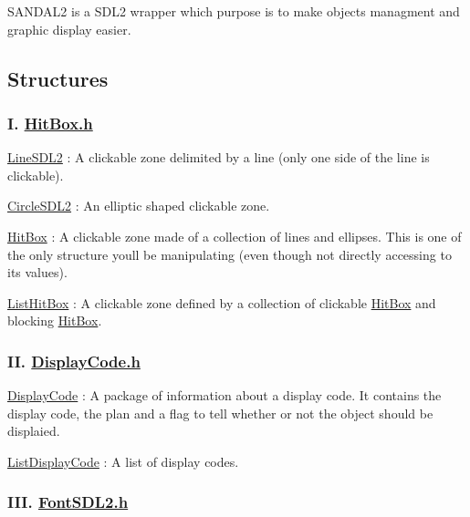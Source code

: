 S\+A\+N\+D\+A\+L2 is a S\+D\+L2 wrapper which purpose is to make objects managment and graphic display easier.

\subsection*{Structures}

\subsubsection*{I. \hyperlink{HitBox_8h}{Hit\+Box.\+h}}


\begin{DoxyEnumerate}
\item \hyperlink{structLineSDL2}{Line\+S\+D\+L2} \+: A clickable zone delimited by a line (only one side of the line is clickable).
\item \hyperlink{structCircleSDL2}{Circle\+S\+D\+L2} \+: An elliptic shaped clickable zone.
\item \hyperlink{structHitBox}{Hit\+Box} \+: A clickable zone made of a collection of lines and ellipses. This is one of the only structure you\textquotesingle{}ll be manipulating (even though not directly accessing to its values).
\item \hyperlink{structListHitBox}{List\+Hit\+Box} \+: A clickable zone defined by a collection of clickable \hyperlink{structHitBox}{Hit\+Box} and blocking \hyperlink{structHitBox}{Hit\+Box}.
\end{DoxyEnumerate}

\subsubsection*{II. \hyperlink{DisplayCode_8h}{Display\+Code.\+h}}


\begin{DoxyEnumerate}
\item \hyperlink{structDisplayCode}{Display\+Code} \+: A package of information about a display code. It contains the display code, the plan and a flag to tell whether or not the object should be displaied.
\item \hyperlink{structListDisplayCode}{List\+Display\+Code} \+: A list of display codes.
\end{DoxyEnumerate}

\subsubsection*{I\+II. \hyperlink{FontSDL2_8h}{Font\+S\+D\+L2.\+h}}


